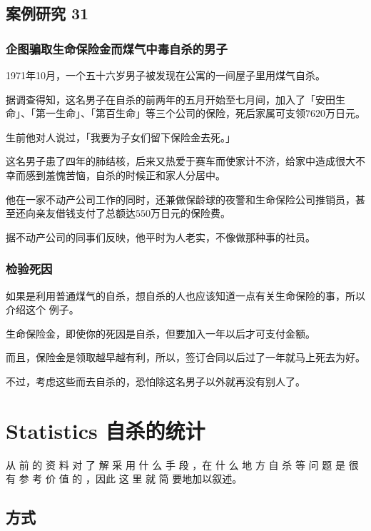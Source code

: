 \documentclass[UTF8]{ctexart}
\begin{document}
\subsection{案例研究 31}

\subsubsection*{企图骗取生命保险金而煤气中毒自杀的男子}

1971年10月，一个五十六岁男子被发现在公寓的一间屋子里用煤气自杀。

据调查得知，这名男子在自杀的前两年的五月开始至七月间，加入了「安田生命」、「第一生命」、「第百生命」等三个公司的保险，死后家属可支领$7620$万日元。

生前他对人说过，「我要为子女们留下保险金去死。」

这名男子患了四年的肺结核，后来又热爱于赛车而使家计不济，给家中造成很大不幸而感到羞愧苦恼，自杀的时候正和家人分居中。

他在一家不动产公司工作的同时，还兼做保龄球的夜警和生命保险公司推销员，甚至还向亲友借钱支付了总额达$550$万日元的保险费。

据不动产公司的同事们反映，他平时为人老实，不像做那种事的社员。

\subsubsection*{检验死因}

如果是利用普通煤气的自杀，想自杀的人也应该知道一点有关生命保险的事，所以介绍这个
例子。

生命保险金，即使你的死因是自杀，但要加入一年以后才可支付金额。

而且，保险金是领取越早越有利，所以，签订合同以后过了一年就马上死去为好。

不过，考虑这些而去自杀的，恐怕除这名男子以外就再没有别人了。


\newpage

\section{Statistics 自杀的统计}

从 前 的 资 料 对 了 解 采 用 什 么 手 段 ，在 什 么 地 方 自 杀 等 问 题 是 很 有 参 考 价 值 的 ，因此 这 里 就 简 要地加以叙述。

\subsection{方式}
\end{document}

